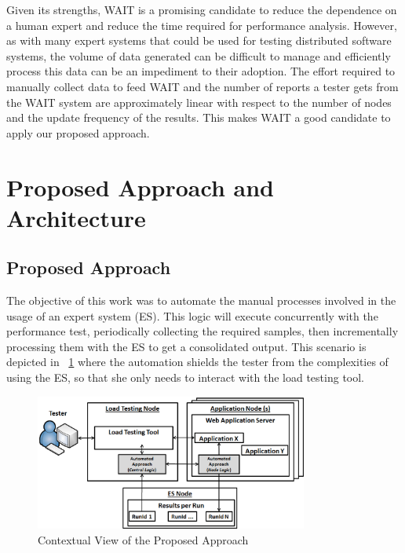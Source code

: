 \documentclass[runningheads,a4paper]{llncs}
\begin{document}
Given its strengths, WAIT is a promising candidate to reduce the
dependence on a human expert and reduce the time required for performance 
analysis. However, as with many expert systems that could be used for testing 
distributed software systems, the volume of data generated can be difficult to 
manage and efficiently process this data can be an impediment to their
adoption. The effort required to manually collect data to feed WAIT and the number 
of reports a tester gets from the WAIT system are approximately linear with
respect to the number of nodes and the update frequency of the results. This makes 
WAIT a good candidate to apply our proposed approach.


\vspace{-7pt}
\section{Proposed Approach and Architecture}
\label{ProposedApproach}
\vspace{-7pt}

\subsection{Proposed Approach}
\vspace{-7pt}
The objective of this work was to automate the manual processes involved
in the usage of an expert system (ES). This logic will execute concurrently with
the performance test, periodically collecting the required samples, then
incrementally processing them with the ES to get a consolidated
output. This scenario is depicted in \figurename ~\ref{fig_Overview} where the
automation shields the tester from the complexities of using the ES, so
that she only needs to interact with the load testing tool.

\vspace{-1pt}
\begin{figure}[!h]
\centering
\includegraphics[totalheight=.18\textheight,width=0.8\textwidth]{architecture_dwait}
\caption{Contextual View of the Proposed Approach}
\label{fig_Overview}
\end{figure}
\end{document}
